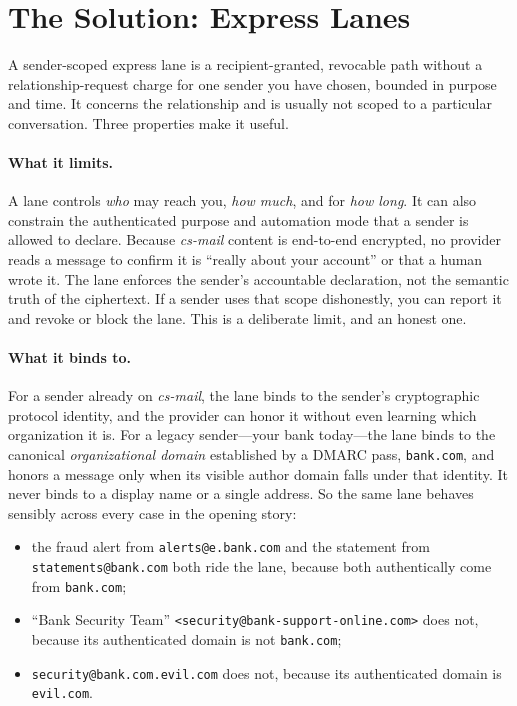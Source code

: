 \documentclass[11pt]{article}
\begin{document}
\section{The Solution: Express Lanes}

A sender-scoped express lane is a recipient-granted, revocable path without a
relationship-request charge for one sender you have chosen, bounded in purpose
and time. It concerns the relationship and is
usually not scoped to a particular conversation. Three properties make it useful.

\paragraph{What it limits.}
A lane controls \emph{who} may reach you, \emph{how much}, and for \emph{how
long}. It can also constrain the authenticated purpose and automation mode that a
sender is allowed to declare. Because \textit{cs-mail} content is end-to-end
encrypted, no provider reads a message to confirm it is ``really about your
account'' or that a human wrote it. The lane enforces the sender's accountable
declaration, not the semantic truth of the ciphertext. If a sender uses that scope
dishonestly, you can report it and revoke or block the lane. This is a deliberate
limit, and an honest one.

\paragraph{What it binds to.}
For a sender already on \textit{cs-mail}, the lane binds to the sender's
cryptographic protocol identity, and the provider can honor it without even
learning which organization it is. For a legacy sender---your bank today---the
lane binds to the canonical \emph{organizational domain} established by a DMARC
pass, \texttt{bank.com}, and honors a message only when its visible author domain
falls under that identity. It never binds to a
display name or a single address. So the same lane behaves sensibly across every
case in the opening story:

\begin{itemize}[leftmargin=2em]
    \item the fraud alert from \texttt{alerts@e.bank.com} and the statement from
    \texttt{statements@bank.com} both ride the lane, because both authentically
    come from \texttt{bank.com};
    \item ``Bank Security Team''
    \texttt{<security@bank-support-online.com>} does not, because its
    authenticated domain is not \texttt{bank.com};
    \item \texttt{security@bank.com.evil.com} does not, because its authenticated
    domain is \texttt{evil.com}.
\end{itemize}
\end{document}
